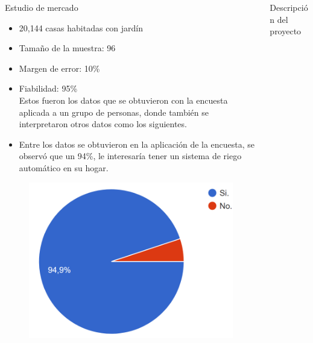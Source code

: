 \documentclass{beamer}
\begin{document}
\begin{frame}[fragile]{}
\begin{columns}[t]
\begin{column}{0.46\textwidth}
\begin{block}{Estudio de mercado}
\begin{minipage}[t]{1\linewidth}
\begin{itemize}
\item 20,144 casas habitadas con jardín
\item Tamaño de la muestra: 96
\item Margen de error: 10\%
\item Fiabilidad: 95\% \\
Estos fueron los datos que se obtuvieron con la encuesta aplicada a un grupo de personas, donde también se interpretaron otros datos como los siguientes.
\item Entre los datos se obtuvieron en la aplicación de la encuesta, se observó que un 94\%, le interesaría tener un sistema de riego automático en su hogar.
\end{itemize}
\begin{figure}[H]
	\centering
	\includegraphics[scale=0.7]{../graphics/Imagen1.png}
\end{figure}

\end{minipage} 
	  	\end{block}
	  \end{column}
	
	 \begin{column}{0.46\linewidth}
	 	\begin{block}{Descripción del proyecto}
	 	

\end{block}
\end{column}
\end{columns}
\end{frame}
\end{document}
